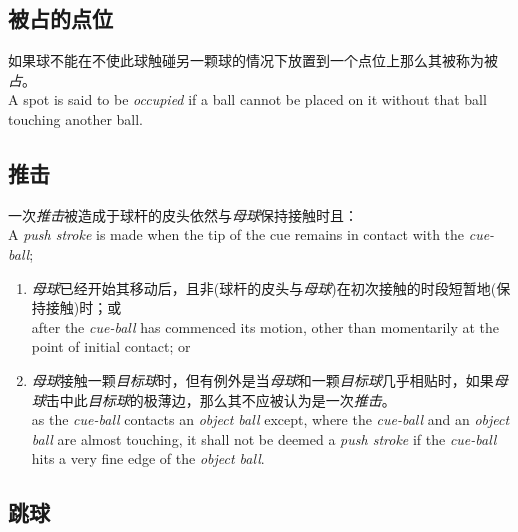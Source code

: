 \subsection{被占的点位}

\noindent 如果球不能在不使此球触碰另一颗球的情况下放置到一个点位上那么其被称为被\emph{占}。\\
A spot is said to be \emph{occupied} if a ball cannot be placed on it without that ball touching another ball.

\subsection{推击}

\noindent 一次\emph{推击}被造成于球杆的皮头依然与\emph{母球}保持接触时且：\\
A \emph{push stroke} is made when the tip of the cue remains in contact with the \emph{cue-ball};
\begin{enumerate}[label=(\alph*)]
    \item \emph{母球}已经开始其移动后，且非(球杆的皮头与\emph{母球})在初次接触的时段短暂地(保持接触)时；或\\
    after the \emph{cue-ball} has commenced its motion, other than momentarily at the point of initial contact; or
    \item \emph{母球}接触一颗\emph{目标球}时，但有例外是当\emph{母球}和一颗\emph{目标球}几乎相贴时，如果\emph{母球}击中此\emph{目标球}的极薄边，那么其不应被认为是一次\emph{推击}。\\
    as the \emph{cue-ball} contacts an \emph{object ball} except, where the \emph{cue-ball} and an \emph{object ball} are almost touching, it shall not be deemed a \emph{push stroke} if the \emph{cue-ball} hits a very fine edge of the \emph{object ball}.
\end{enumerate}

\subsection{跳球}

